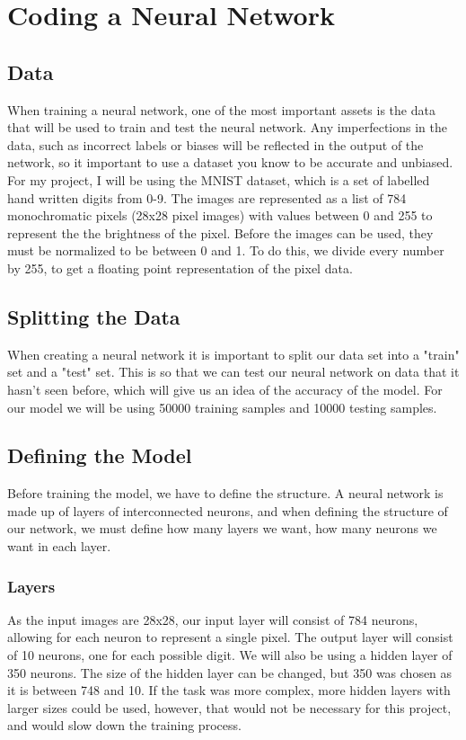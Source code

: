 \documentclass[titlepage]{article}
\begin{document}
\section{Coding a Neural Network}
\subsection{Data}
When training a neural network, one of the most important assets is the data that will be used to train and test the neural network. Any imperfections in the data, such as incorrect labels or biases will be reflected in the output of the network, so it important to use a dataset you know to be accurate and unbiased. For my project, I will be using the MNIST dataset, which is a set of labelled hand written digits from 0-9. The images are represented as a list of 784 monochromatic pixels (28x28 pixel images) with values between 0 and 255 to represent the the brightness of the pixel. Before the images can be used, they must be normalized to be between 0 and 1. To do this, we divide every number by 255, to get a floating point representation of the pixel data.
\subsection{Splitting the Data}
When creating a neural network it is important to split our data set into a "train" set and a "test" set. This is so that we can test our neural network on data that it hasn't seen before, which will give us an idea of the accuracy of the model. For our model we will be using 50000 training samples and 10000 testing samples.
\subsection{Defining the Model}
Before training the model, we have to define the structure. A neural network is made up of layers of interconnected neurons, and when defining the structure of our network, we must define how many layers we want, how many neurons we want in each layer.
\subsubsection{Layers}
As the input images are 28x28, our input layer will consist of 784 neurons, allowing for each neuron to represent a single pixel. The output layer will consist of 10 neurons, one for each possible digit. We will also be using a hidden layer of 350 neurons. The size of the hidden layer can be changed, but 350 was chosen as it is between 748 and 10. If the task was more complex, more hidden layers with larger sizes could be used, however, that would not be necessary for this project, and would slow down the training process.
\end{document}
